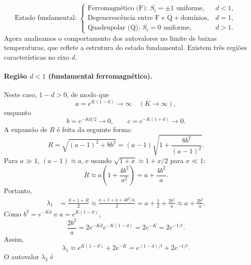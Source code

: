 \documentclass[11pt,a4paper]{article}
\begin{document}
%
\begin{equation}
    \boxed{
    \text{Estado fundamental: }
    \begin{cases}
        \text{Ferromagnético (F): } S_i = \pm 1 \text{ uniforme}, & d < 1, \\[4pt]
        \text{Degenerescência entre F e Q} + \text{domínios}, & d = 1, \\[4pt]
        \text{Quadrupolar (Q): } S_i = 0 \text{ uniforme}, & d > 1.
    \end{cases}
    }
    \label{eq:gs_BC}
\end{equation}
%
Agora analisamos o comportamento dos autovalores no limite de baixas temperaturas, que reflete a estrutura do estado fundamental. Existem três regiões características no eixo $d$.
%
\paragraph{Região $d < 1$ (fundamental ferromagnético).}
%
Neste caso, $1 - d > 0$, de modo que
%
\begin{equation}
    a = e^{K(1-d)} \to \infty \quad (K \to \infty),
\end{equation}
%
enquanto
%
\begin{equation}
    b = e^{-Kd/2} \to 0, \qquad c = e^{-K(1+d)} \to 0.
\end{equation}
%
A expansão de $R$ é feita da seguinte forma:
%
\begin{equation}
    R = \sqrt{(a - 1)^2 + 8b^2} = (a - 1) \sqrt{1 + \frac{8b^2}{(a-1)^2}}.
\end{equation}
%
Para $a \gg 1$, $(a-1) \approx a$, e usando $\sqrt{1+x} \approx 1 + x/2$ para $x \ll 1$:
%
\begin{equation}
    R \approx a \left( 1 + \frac{4b^2}{a^2} \right) = a + \frac{4b^2}{a}.
\end{equation}
%
Portanto,
%
\begin{align}
    \lambda_1 &= \frac{S + 1 + R}{2} \approx \frac{a + 1 + a + 4b^2/a}{2}
    = a + \frac{1}{2} + \frac{2b^2}{a} \approx a + \frac{2b^2}{a}.
\end{align}
%
Como $b^2 = e^{-Kd}$ e $a = e^{K(1-d)}$,
%
\begin{equation}
    \frac{2b^2}{a} = 2 e^{-Kd} e^{-K(1-d)} = 2 e^{-K} = 2 e^{-1/t}.
\end{equation}
%
Assim,
%
\begin{equation}
    \lambda_1 \approx e^{K(1-d)} + 2 e^{-K} = e^{(1-d)/t} + 2 e^{-1/t}.
\end{equation}
%
O autovalor $\lambda_3$ é
\end{document}
